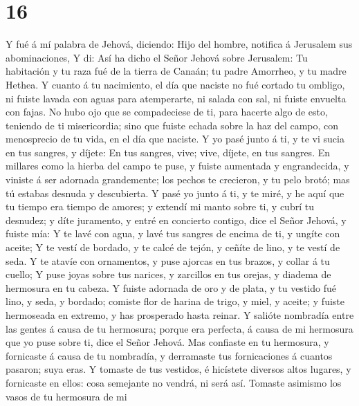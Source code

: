 \hypertarget{section-15}{%
\section{16}\label{section-15}}

 Y fué á mí palabra de Jehová, diciendo: 
Hijo del hombre, notifica á Jerusalem sus abominaciones, 
Y di: Así ha dicho el Señor Jehová sobre Jerusalem: Tu habitación y tu
raza fué de la tierra de Canaán; tu padre Amorrheo, y tu madre Hethea.
 Y cuanto á tu nacimiento, el día que naciste no fué
cortado tu ombligo, ni fuiste lavada con aguas para atemperarte, ni
salada con sal, ni fuiste envuelta con fajas.  No hubo ojo
que se compadeciese de ti, para hacerte algo de esto, teniendo de ti
misericordia; sino que fuiste echada sobre la haz del campo, con
menosprecio de tu vida, en el día que naciste.  Y yo pasé
junto á ti, y te vi sucia en tus sangres, y díjete: En tus sangres,
vive; vive, díjete, en tus sangres.  En millares como la
hierba del campo te puse, y fuiste aumentada y engrandecida, y viniste á
ser adornada grandemente; los pechos te crecieron, y tu pelo brotó; mas
tú estabas desnuda y descubierta.  Y pasé yo junto á ti, y
te miré, y he aquí que tu tiempo era tiempo de amores; y extendí mi
manto sobre ti, y cubrí tu desnudez; y díte juramento, y entré en
concierto contigo, dice el Señor Jehová, y fuiste mía:  Y
te lavé con agua, y lavé tus sangres de encima de ti, y ungíte con
aceite;  Y te vestí de bordado, y te calcé de tejón, y
ceñíte de lino, y te vestí de seda.  Y te atavíe con
ornamentos, y puse ajorcas en tus brazos, y collar á tu cuello;
 Y puse joyas sobre tus narices, y zarcillos en tus
orejas, y diadema de hermosura en tu cabeza.  Y fuiste
adornada de oro y de plata, y tu vestido fué lino, y seda, y bordado;
comiste flor de harina de trigo, y miel, y aceite; y fuiste hermoseada
en extremo, y has prosperado hasta reinar.  Y salióte
nombradía entre las gentes á causa de tu hermosura; porque era perfecta,
á causa de mi hermosura que yo puse sobre ti, dice el Señor Jehová.
 Mas confiaste en tu hermosura, y fornicaste á causa de
tu nombradía, y derramaste tus fornicaciones á cuantos pasaron; suya
eras.  Y tomaste de tus vestidos, é hicístete diversos
altos lugares, y fornicaste en ellos: cosa semejante no vendrá, ni será
así.  Tomaste asimismo los vasos de tu hermosura de mi
